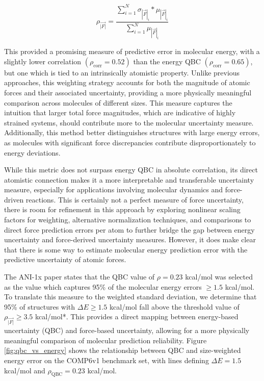 \begin{equation}
    \rho_{\vec{|F|}} = \frac{\sum_{i=1}^{N} \sigma_{|\vec{F}|_i}* \mu_{|\vec{F}|_i}}{\sum_{i=1}^{N} \mu_{|\vec{F}|_i}}
    \label{eq:mag_weighted_force_uncertainty}
\end{equation}

This provided a promising measure of predictive error in molecular energy, with a slightly lower correlation $(\rho_\text{corr} = 0.52)$ than the energy QBC $(\rho_\text{corr} = 0.65)$, but one which is tied to an intrinsically atomistic property.
Unlike previous approaches, this weighting strategy accounts for both the magnitude of atomic forces and their associated uncertainty, providing a more physically meaningful comparison across molecules of different sizes.
This measure captures the intuition that larger total force magnitudes, which are indicative of highly strained systems, should contribute more to the molecular uncertainty measure.
Additionally, this method better distinguishes structures with large energy errors, as molecules with significant force discrepancies contribute disproportionately to energy deviations.

While this metric does not surpass energy QBC in absolute correlation, its direct atomistic connection makes it a more interpretable and transferable uncertainty measure, especially for applications involving molecular dynamics and force-driven reactions.
This is certainly not a perfect measure of force uncertainty, there is room for refinement in this approach by exploring nonlinear scaling factors for weighting, alternative normalization techniques, and comparisons to direct force prediction errors per atom to further bridge the gap between energy uncertainty and force-derived uncertainty measures.
However, it does make clear that there is some way to estimate molecular energy prediction error with the predictive uncertainty of atomic forces.

The ANI-1x paper \cite{ani-1x} states that the QBC value of $\rho = 0.23$ kcal/mol was selected as the value which captures 95\% of the molecular energy errors $\geq 1.5$ kcal/mol.
To translate this measure to the weighted standard deviation, we determine that 95\% of structures with $\Delta E \geq 1.5$ kcal/mol fall above the 
threshold value of $\rho_{\vec{|F|}} \geq 3.5$ kcal/mol*\angstrom. 
This provides a direct mapping between energy-based uncertainty (QBC) and force-based uncertainty, allowing for a more physically meaningful comparison of molecular prediction reliability.
Figure \ref{fig:qbc_vs_energy} shows the relationship between QBC and size-weighted energy error on the COMP6v1 benchmark set, with lines defining $\Delta E = 1.5$ kcal/mol and $\rho_\text{QBC} = 0.23$ kcal/mol.

